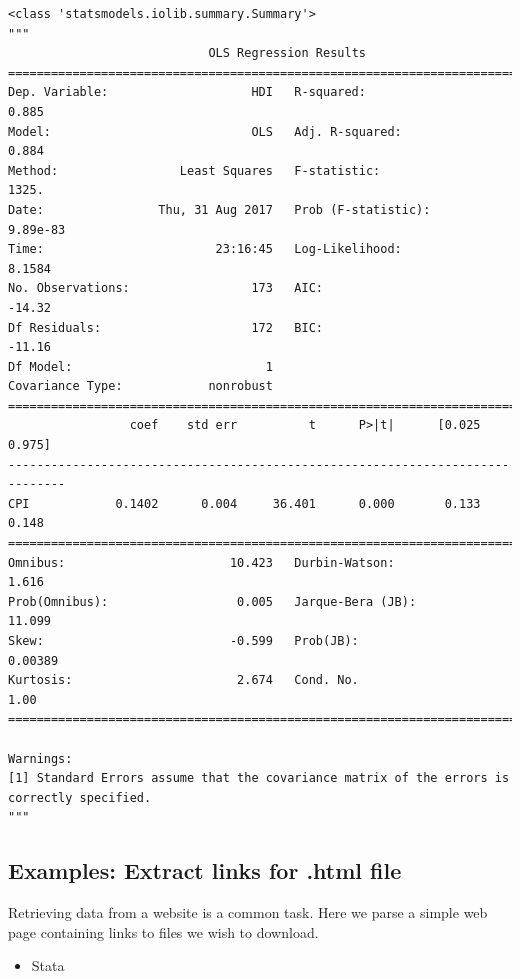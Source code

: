 \documentclass[]{book}
\providecommand{\tightlist}{%
  \setlength{\itemsep}{0pt}\setlength{\parskip}{0pt}}
\begin{document}
\begin{verbatim}
<class 'statsmodels.iolib.summary.Summary'>
"""
                            OLS Regression Results                            
==============================================================================
Dep. Variable:                    HDI   R-squared:                       0.885
Model:                            OLS   Adj. R-squared:                  0.884
Method:                 Least Squares   F-statistic:                     1325.
Date:                Thu, 31 Aug 2017   Prob (F-statistic):           9.89e-83
Time:                        23:16:45   Log-Likelihood:                 8.1584
No. Observations:                 173   AIC:                            -14.32
Df Residuals:                     172   BIC:                            -11.16
Df Model:                           1                                         
Covariance Type:            nonrobust                                         
==============================================================================
                 coef    std err          t      P>|t|      [0.025      0.975]
------------------------------------------------------------------------------
CPI            0.1402      0.004     36.401      0.000       0.133       0.148
==============================================================================
Omnibus:                       10.423   Durbin-Watson:                   1.616
Prob(Omnibus):                  0.005   Jarque-Bera (JB):               11.099
Skew:                          -0.599   Prob(JB):                      0.00389
Kurtosis:                       2.674   Cond. No.                         1.00
==============================================================================

Warnings:
[1] Standard Errors assume that the covariance matrix of the errors is correctly specified.
"""
\end{verbatim}

\subsection{Examples: Extract links for .html
file}\label{examples-extract-links-for-.html-file}

Retrieving data from a website is a common task. Here we parse a simple
web page containing links to files we wish to download.

\begin{itemize}
\tightlist
\item
  Stata
\end{itemize}
\end{document}
